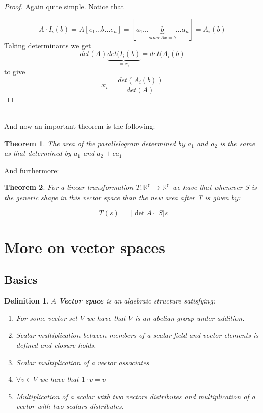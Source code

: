 \documentclass[titlepage]{article}
\newtheorem{thm}{Theorem}[subsection]
\newtheorem{definition}{Definition}[subsection]
\numberwithin{equation}{subsection}
\begin{document}
\begin{proof}
Again quite simple. Notice that 

$$A\cdot I_{i}(b) = A[e_{1} \ldots b \dots e_{n}] = [a_{1} \ldots \underbrace{b}_{since Ax = b} \ldots a_{n}] = A_{i}(b)$$
Taking determinants we get $$det(A)\underbrace{det(I_{i}(b)}_{=x_{i}} = det(A_{i}(b)$$ to give $$ x_{i} = \frac{det(A_{i}(b))}{det(A)}$$
\end{proof}
\\
And now an important theorem is the following:

\begin{thm}
The area of the parallelogram determined by $a_{1}$ and $a_{2}$ is the same as that determined by $a_{1}$ and $a_{2} + ca_{1}$
\end{thm}

And furthermore:

\begin{thm}
For a linear transformation $T: \mathbb{R^{n}} \to  \mathbb{R^{n}}$ we have that whenever S is the generic shape in this vector space than the new area after T is given by:

$$ |T(s)| = |\det{A} \cdot |S|s$$
\end{thm}

\clearpage

\section{More on vector spaces}
\subsection{Basics}

\begin{tcolorbox}
\begin{definition}
A \textbf{Vector space} is an algebraic structure satisfying:

\begin{enumerate}
    \item For some vector set $V$ we have that $V$ is an abelian group under addition.
    \item Scalar multiplication between members of a scalar field and vector elements is defined and closure holds.
    \item Scalar multiplication of a vector associates
    \item $\forall v \in V$ we have that $1\cdot v = v$
    \item Multiplication of a scalar with two vectors distributes and multiplication of a vector with two scalars distributes. 
\end{enumerate}
\end{definition}
\end{tcolorbox}
\end{document}

